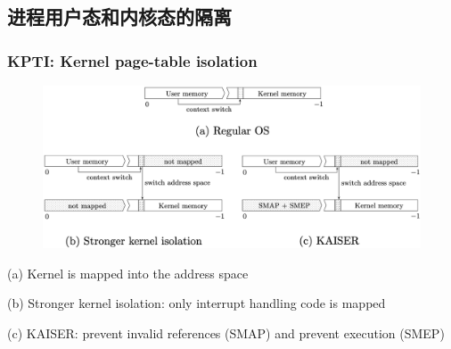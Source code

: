 \subsection{进程用户态和内核态的隔离} %
\begin{frame}
    \frametitle{KPTI: Kernel page-table isolation}
	  	\begin{figure}
	  	\includegraphics[width=0.8\linewidth]{figs/kaiser.png}
	  	\end{figure} \pause

        (a) Kernel is mapped into the address space \pause

        (b) Stronger kernel isolation: only  interrupt  handling  code  is mapped \pause
        
        (c) KAISER: prevent invalid references (SMAP) and prevent execution (SMEP)
\end{frame}
% 
% 
% 
% 
